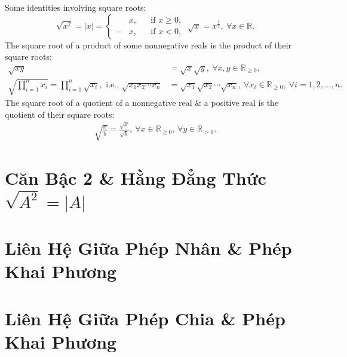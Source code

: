 \documentclass{article}
\begin{document}
Some identities involving square roots:
\begin{equation*}
	\boxed{\sqrt{x^2} = |x| = \left\{\begin{split}
		&x,&&\mbox{if } x\ge0,\\
		-&x,&&\mbox{if } x < 0,
	\end{split}\right.\ \sqrt{x} = x^{\frac{1}{2}},\ \forall x\in\mathbb{R}.}
\end{equation*}
The square root of a product of some nonnegative reals is the product of their square roots:
\begin{equation*}
	\boxed{\left.\begin{split}
		\sqrt{xy} &= \sqrt{x}\sqrt{y},\ \forall x,y\in\mathbb{R}_{\ge0},\\
		\sqrt{\prod_{i=1}^n x_i} = \prod_{i=1}^n \sqrt{x_i},\mbox{ i.e., } \sqrt{x_1x_2\cdots x_n} &= \sqrt{x_1}\sqrt{x_2}\cdots\sqrt{x_n},\ \forall x_i\in\mathbb{R}_{\ge0},\ \forall i = 1,2,\ldots,n.
	\end{split}\right.}
\end{equation*}
The square root of a quotient of a nonnegative real \& a positive real is the quotient of their square roots:
\begin{align*}
	\boxed{\sqrt{\frac{x}{y}} = \frac{\sqrt{x}}{\sqrt{y}},\ \forall x\in\mathbb{R}_{\ge0},\,\forall y\in\mathbb{R}_{> 0}.}
\end{align*}


\section{Căn Bậc 2 \& Hằng Đẳng Thức $\sqrt{A^2} = |A|$}


\section{Liên Hệ Giữa Phép Nhân \& Phép Khai Phương}


\section{Liên Hệ Giữa Phép Chia \& Phép Khai Phương}
\end{document}
